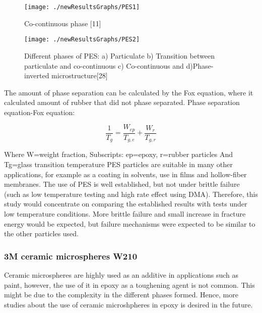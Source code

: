 \documentclass[numbers=noendperiod,chapterprefix=on]{icldt} %
\begin{document}
\begin{figure}[!hp]
\centering
\texttt{[image: ./newResultsGraphs/PES1]}
\caption{Co-continuous phase [11]}
\end{figure}

\begin{figure}[!hp]
\centering
\texttt{[image: ./newResultsGraphs/PES2]}
\caption{Different phases of PES: a) Particulate b) Transition between particulate and co-continuous c) Co-continuous and d)Phase-inverted microstructure[28]}
\end{figure}

The amount of phase separation can be calculated by the Fox equation, where it calculated amount of rubber that did not phase separated.
Phase separation equation-Fox equation:

\begin{equation} 
\frac{1}{T_g} =\frac{W_{ep}}{T_{g,e}}+\frac{W_r}{T_{g,r}} 
\end{equation}

Where W=weight fraction,
Subscripts: ep=epoxy, r=rubber particles
And Tg=glass transition temperature\newline
PES particles are suitable in many other applications, for example as a coating in solvents, use in films and hollow-fiber membranes. The use of PES is well established, but not under brittle failure (such as low temperature testing and high rate effect using DMA). Therefore, this study would concentrate on comparing the established results with tests under low temperature conditions. More brittle failure and small increase in fracture energy would be expected, but failure mechanisms were expected to be similar to the other particles used.
\subsubsection{3M ceramic microspheres W210}
Ceramic microspheres are highly used as an additive in applications such as paint, however, the use of it in epoxy as a toughening agent is not common. This might be due to the complexity in the different phases formed. Hence, more studies about the use of ceramic microshpheres in epoxy is desired in the future.
\end{document}
